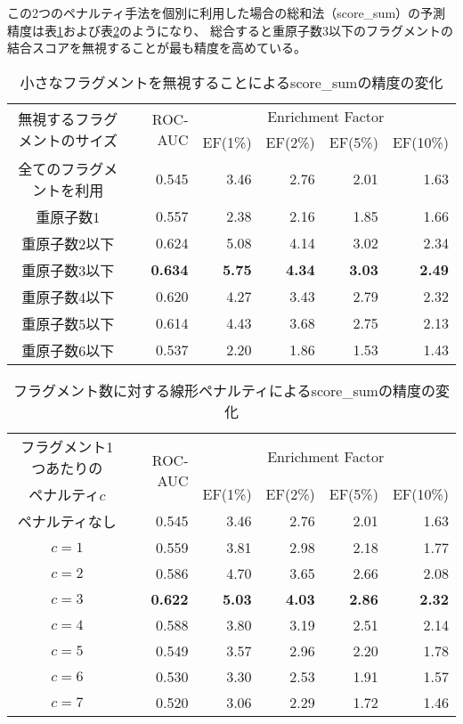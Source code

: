 この2つのペナルティ手法を個別に利用した場合の総和法（score\_sum）の予測精度は表\ref{table:omit}および表\ref{table:penalty}のようになり、
総合すると重原子数3以下のフラグメントの結合スコアを無視することが最も精度を高めている。

\begin{table}[h] \centering
	\caption{小さなフラグメントを無視することによるscore\_sumの精度の変化}
	\label{table:omit}
	\begin{tabular}{c|rrrrr}
	\hline
	\multirow{2}{*}{無視するフラグメントのサイズ}	&\multirow{2}{*}{ROC-AUC}	&\multicolumn{4}{c}{Enrichment Factor}				\\
										&						&EF(1\%)		&EF(2\%)		&EF(5\%)		&EF(10\%)	\\ \hline
	全てのフラグメントを利用					&0.545					&3.46		&2.76		&2.01		&1.63		\\
	重原子数1							&0.557					&2.38		&2.16		&1.85		&1.66		\\
	重原子数2以下						&0.624					&5.08		&4.14		&3.02		&2.34		\\
	重原子数3以下						&{\bf 0.634}				&{\bf 5.75}	&{\bf 4.34}	&{\bf 3.03}	&{\bf 2.49}	\\
	重原子数4以下						&0.620					&4.27		&3.43		&2.79		&2.32		\\
	重原子数5以下						&0.614					&4.43		&3.68		&2.75		&2.13		\\
	重原子数6以下						&0.537					&2.20		&1.86		&1.53		&1.43		\\ \hline
	\end{tabular}
\end{table}
\begin{table}[h] \centering
	\caption{フラグメント数に対する線形ペナルティによるscore\_sumの精度の変化}
	\label{table:penalty}
	\begin{tabular}{c|rrrrr}
	\hline
	フラグメント1つあたりの	&\multirow{2}{*}{ROC-AUC}	&\multicolumn{4}{c}{Enrichment Factor}				\\
	ペナルティ$c$			&						&EF(1\%)		&EF(2\%)		&EF(5\%)		&EF(10\%)	\\ \hline
	ペナルティなし			&0.545					&3.46		&2.76		&2.01		&1.63		\\
	$c=1$				&0.559					&3.81		&2.98		&2.18		&1.77		\\
	$c=2$				&0.586					&4.70		&3.65		&2.66		&2.08		\\
	$c=3$				&{\bf 0.622}				&{\bf 5.03}	&{\bf 4.03}	&{\bf 2.86}	&{\bf 2.32}	\\
	$c=4$				&0.588					&3.80		&3.19		&2.51		&2.14		\\
	$c=5$				&0.549					&3.57		&2.96		&2.20		&1.78		\\
	$c=6$				&0.530					&3.30		&2.53		&1.91		&1.57		\\
	$c=7$				&0.520					&3.06		&2.29		&1.72		&1.46		\\ \hline
	\end{tabular}
\end{table}

